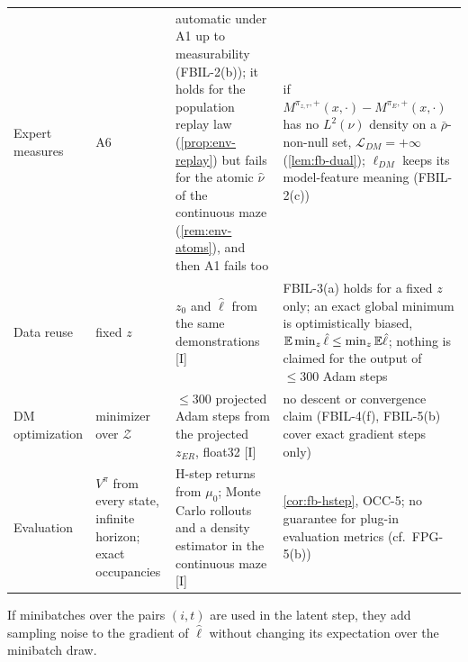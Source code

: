 \begin{center}
\begin{tabular}{@{}>{\raggedright\arraybackslash}p{}>{\raggedright\arraybackslash}p{}>{\raggedright\arraybackslash}p{}>{\raggedright\arraybackslash}p{}@{}}
Expert measures & A6 & automatic under A1 up to measurability (FBIL-2(b)); it holds for the population replay law (\cref{prop:env-replay}) but fails for the atomic $\hat\nu$ of the continuous maze (\cref{rem:env-atoms}), and then A1 fails too & if $M^{\pi_{z,\tau},+}(x,\cdot)-M^{\pi_E,+}(x,\cdot)$ has no $L^2(\nu)$ density on a $\bar\rho$-non-null set, $\mathcal L_{DM}=+\infty$ (\cref{lem:fb-dual}); $\ell_{DM}$ keeps its model-feature meaning (FBIL-2(c))\\
Data reuse & fixed $z$ & $z_0$ and $\hat\ell$ from the same demonstrations \textsf{[I]} & FBIL-3(a) holds for a fixed $z$ only; an exact global minimum is optimistically biased, $\mathbb{E}\min_z\hat\ell\le\min_z\mathbb{E}\hat\ell$; nothing is claimed for the output of $\le300$ Adam steps\\
DM optimization & minimizer over $\mathcal Z$ & $\le300$ projected Adam steps from the projected $z_{ER}$, float32 \textsf{[I]} & no descent or convergence claim (FBIL-4(f), FBIL-5(b) cover exact gradient steps only)\\
Evaluation & $V^\pi$ from every state, infinite horizon; exact occupancies & H-step returns from $\mu_0$; Monte Carlo rollouts and a density estimator in the continuous maze \textsf{[I]} & \cref{cor:fb-hstep}, OCC-5; no guarantee for plug-in evaluation metrics (cf.\ FPG-5(b))\\
\bottomrule
\end{tabular}
\end{center}
If minibatches over the pairs $(i,t)$ are used in the latent step, they add sampling noise to the gradient of $\hat\ell$ without changing its expectation over the minibatch draw.

